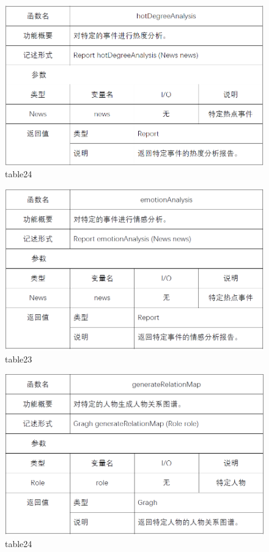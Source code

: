 \begin{figure}[!htb]
	\centering
	\includegraphics[scale=1]{image/b24.png} %
	\caption{table24} %
\end{figure}
\begin{figure}[!htb]
	\centering
	\includegraphics[scale=1]{image/b25.png} %
	\caption{table23} %
\end{figure}
\begin{figure}[!htb]
	\centering
	\includegraphics[scale=1]{image/b26.png} %
	\caption{table24} %
\end{figure}
